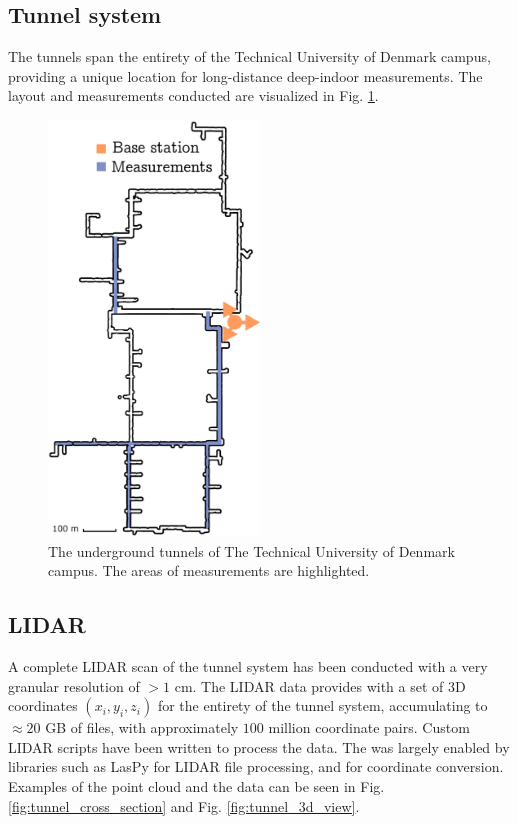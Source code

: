 \subsection{Tunnel system}
The tunnels span the entirety of the Technical University of Denmark campus, providing a unique location for long-distance deep-indoor measurements. The layout and measurements conducted are visualized in Fig. \ref{fig:underground_tunnel_system}.

\begin{figure}
    \centering
    \includegraphics[width=0.5\textwidth]{chapters/part_pathloss/figures/outdoor_to_indoor/Complete_tunnel_system.eps}
    \caption{The underground tunnels of The Technical University of Denmark campus. The areas of measurements are highlighted.}
    \label{fig:underground_tunnel_system}
\end{figure}





\subsection{LIDAR}
A complete LIDAR scan of the tunnel system has been conducted with a very granular resolution of $> 1$ cm. The LIDAR data provides with a set of $3$D coordinates $(x_i, y_i, z_i)$ for the entirety of the tunnel system, accumulating to $\approx 20$ GB of files, with approximately $100$ million coordinate pairs. Custom LIDAR scripts have been written to process the data. The was largely enabled by libraries such as LasPy \cite{Grantbrown/laspy:1.0-1.4.} for LIDAR file processing, and \cite{alan_d_snow_2020_3714221} for coordinate conversion. Examples of the point cloud and the data can be seen in Fig. \ref{fig:tunnel_cross_section} and Fig. \ref{fig:tunnel_3d_view}.

